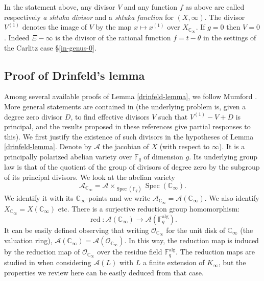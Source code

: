 \documentclass[11pt]{amsart}
\numberwithin{equation}{section}
\newcommand{\FF}{\mathbb{F}}
\newcommand{\CC}{\mathbb{C}}
\begin{document}
In the statement above, any divisor $V$ and any function $f$ as above are called respectively {\em a shtuka divisor} and a {\em shtuka function} for $(X,\infty)$. The divisor $V^{(1)}$ denotes the image of $V$ by the map $x\mapsto x^{(1)}$ over $X_{\CC_\infty}$. 
If $g=0$ then $V=0$. Indeed $\Xi-\infty$ is the divisor of the rational function $f=t-\theta$ in the settings of the Carlitz case \S \ref{in-genus-0}. 

\subsection{Proof of Drinfeld's lemma}\label{construction-shtuka-divisors} Among several available proofs of Lemma \ref{drinfeld-lemma}, we follow Mumford \cite{MUM}. More general statements are contained in \cite{THA-1,FER1} (the underlying problem is, given a degree zero divisor $D$, to find effective divisors $V$ such that $V^{(1)}-V+D$ is principal, and the results proposed in these references give partial responses to this).
We first justify the existence of such divisors in the hypotheses of Lemma \ref{drinfeld-lemma}. Denote by $\mathcal{A}$ the jacobian of $X$ (with respect to $\infty$). It is a principally polarized abelian variety over $\FF_q$ of dimension $g$. Its underlying group law is that of the quotient of the group of divisors of degree zero by the subgroup of its principal divisors. We look at the abelian variety
$$\mathcal{A}_{\CC_\infty}=\mathcal{A}\times_{\operatorname{Spec}(\FF_q)}\operatorname{Spec}(\CC_\infty).$$
We identify it with its $\CC_\infty$-points and we write $\mathcal{A}_{\CC_\infty}=\mathcal{A}(\CC_\infty)$. We also identify 
$X_{\CC_\infty}=X(\CC_\infty)$ etc.
There is a surjective reduction group homomorphism:
$$\operatorname{red}:\mathcal{A}(\CC_\infty)\rightarrow\mathcal{A}(\FF_q^{\text{alg}}).$$
It can be easily defined observing that writing $\mathcal{O}_{\CC_\infty}$ for the unit disk of $\CC_\infty$ (the valuation ring),
$\mathcal{A}(\CC_\infty)=\mathcal{A}(\mathcal{O}_{\CC_\infty})$. In this way, the reduction map is induced by the reduction
map of $\mathcal{O}_{\CC_\infty}$ over the residue field $\FF_q^{\text{alg}}$. The reduction maps are studied in \cite{FER1}
when considering $\mathcal{A}(L)$ with $L$ a finite extension of $K_\infty$, but the properties we review here can be easily deduced from that case.
\end{document}
